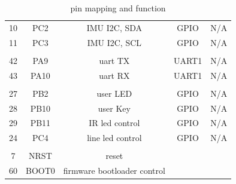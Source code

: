 \documentclass[12pt,twoside,onecolumn,openany,extrafontsizes,dvipsnames]{memoir}
\begin{document}
\begin{table}[h!]
\begin{tabular}{||c c c c c||}
                10 & PC2 & IMU I2C, SDA & GPIO & N/A \\ 
                11 & PC3 & IMU I2C, SCL & GPIO & N/A \\ 
                & & & & \\
                42 & PA9 & uart TX & UART1 & N/A \\ 
                43 & PA10 & uart RX & UART1 & N/A \\ 
                & & & & \\
                27 & PB2 & user LED & GPIO & N/A \\ 
                28 & PB10 & user Key & GPIO & N/A \\ 
                29 & PB11 & IR led control & GPIO & N/A \\ 
                24 & PC4 & line led control & GPIO & N/A \\ 
                & & & & \\
                7 & NRST & reset &  &  \\ 
                60 & BOOT0 & firmware bootloader control &  &  \\ 
            \hline
            \end{tabular}
        \caption{pin mapping and function}
        \label{table:1}
    \end{table}
\end{document}
